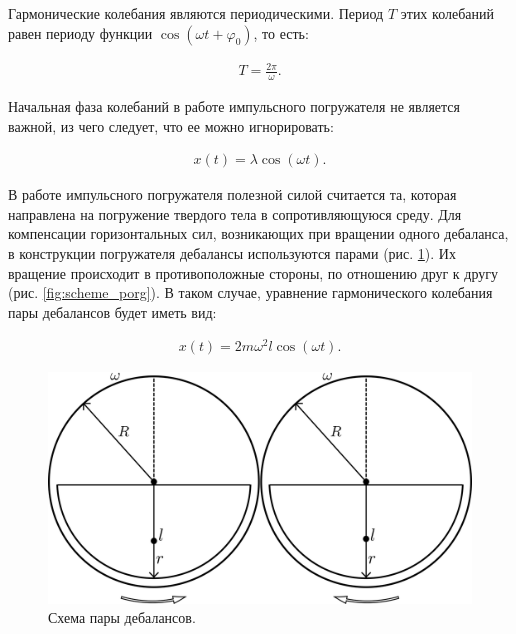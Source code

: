 Гармонические колебания являются периодическими. Период $T$ этих колебаний равен периоду функции $\cos (\omega t + \varphi_0)$, то есть:

\begin{equation*}
    \begin{aligned}
        T = \frac{2 \pi}{\omega}.
    \end{aligned}
\end{equation*}

Начальная фаза колебаний в работе импульсного погружателя не является важной, из чего следует, что ее можно игнорировать:

\begin{equation}\label{eq:harmonic_notphi}
    \begin{aligned}
        x(t) = \lambda \cos (\omega t).
    \end{aligned}
\end{equation}

В работе импульсного погружателя полезной силой считается та, которая направлена на погружение твердого тела в сопротивляющуюся среду.
Для компенсации горизонтальных сил, возникающих при вращении одного дебаланса,
в конструкции погружателя дебалансы используются парами (рис. \ref{fig:double_debalance}).
Их вращение происходит в противоположные стороны, по отношению друг к другу (рис. \ref{fig:scheme_porg}).
В таком случае, уравнение гармонического колебания пары дебалансов будет иметь вид:

\begin{equation}\label{eq:harmonic_dual}
    \begin{aligned}
        x(t) = 2 m \omega^2 l \cos (\omega t).
    \end{aligned}
\end{equation}

\begin{figure}[h]
    \centering
    \includegraphics[width=0.8\linewidth]{img/double_debalance.png}
    \caption{Схема пары дебалансов.}
    \label{fig:double_debalance}
\end{figure}

